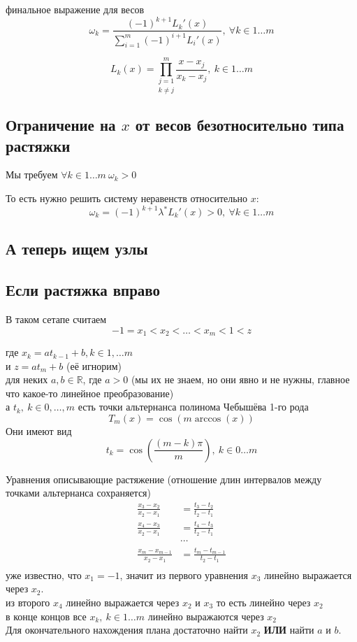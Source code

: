 \documentclass[12pt,a4paper]{article}
\begin{document}
	\noindent финальное выражение для весов
	\[
	\omega_k  = 
	\frac
	{
		(-1)^{k+1} L_k'(x)
	}
	{
		\sum_{i=1}^{m} (-1)^{i+1}  L_i'(x)
	}, \ \forall k \in 1 \ldots m 
	\]
	
	\[
	L_k(x) = \underset{k \neq j}{\prod_{j=1}^{m}} \frac{x - x_j}{x_k - x_j}, \ k \in 1 \ldots m
	\]
	
	\subsection{Ограничение на $x$ от весов безотносительно типа растяжки}
	
	Мы требуем $\forall k \in 1 \ldots m \ \omega_k > 0 $
	
	\noindent То есть нужно решить систему неравенств относительно $x$:
	\[
	\omega_k  = (-1)^{k+1} \lambda^* L_k'(x) > 0 , \ \forall k \in 1 \ldots m 
	\]
	
	\newpage
	\subsection{А теперь ищем узлы}
	
	\subsection*{Если растяжка вправо}
	
	\noindent В таком сетапе считаем
	\[
	-1 = x_1 < x_2 < \ldots < x_m < 1 < z
	\]
	
	\noindent где $x_k = a t_{k-1} + b, k \in 1, \ldots m$ \\
	и $z=a t_m + b$ (её игнорим)\\
	для неких $a, b \in \mathbb{R}$, где $a > 0$ (мы их не знаем, но они явно и не нужны, главное что какое-то линейное преобразование) \\
	а $t_k, \  k \in 0, \ldots, m$ есть точки альтернанса полинома Чебышёва 1-го рода 
	\[
	T_{m}(x) = \cos( m \arccos(x))
	\]
	\noindent Они имеют вид 
	\[
	t_k = \cos \left( \frac{ (m-k) \pi}{m} \right), \ k \in 0 \ldots m
	\]
	
	\noindent Уравнения описывающие растяжение (отношение длин интервалов между точками альтернанса сохраняется)
	\begin{align*}
		\frac{x_3 - x_2}{x_2 - x_1} &= \frac{t_3 - t_2}{t_2 - t_1}\\ 
		\frac{x_4 - x_3}{x_2 - x_1} &= \frac{t_4 - t_3}{t_2 - t_1}\\
		&\cdots\\
		\frac{x_m - x_{m-1}}{x_2 - x_1} &= \frac{t_m - t_{m-1}}{t_2 - t_1}\\
	\end{align*}
	\noindent уже известно, что $x_1 = -1$, значит из первого уравнения $x_3$ линейно выражается через $x_2$.\\
	из второго $x_4$ линейно выражается через $x_2$ и $x_3$ то есть линейно через $x_2$\\
	в конце концов все $x_k, \ k \in 1 \ldots m $ линейно выражаются через $x_2$\\
	Для окончательного нахождения плана достаточно найти $x_2$ 
	\textbf{ИЛИ} найти $a$ и $b$.\\
	
\end{document}
